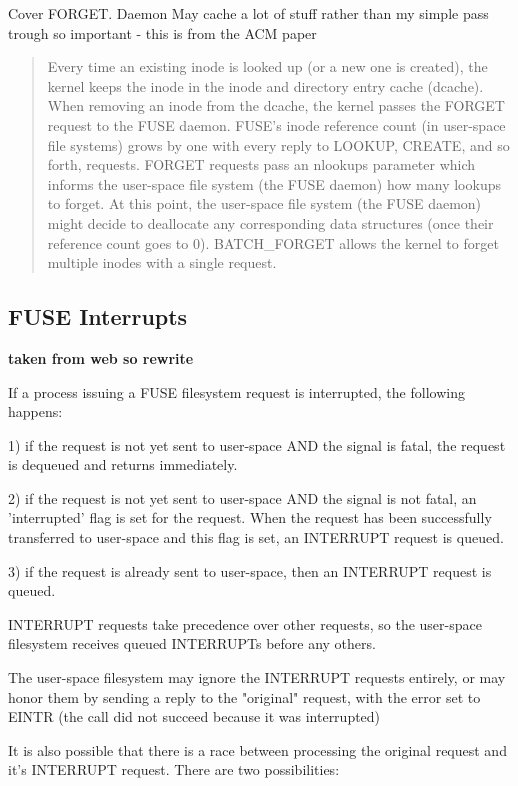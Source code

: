 Cover FORGET. Daemon May cache a lot of stuff rather than my simple pass trough so important - this is from the ACM paper

\begin{quote}
Every time an existing inode is looked up (or a new one is created), the kernel keeps the inode in the inode and directory entry cache (dcache). When removing an inode from the dcache, the kernel passes the FORGET request to the FUSE daemon. FUSE's inode reference count (in user-space file systems) grows by one with every reply to LOOKUP, CREATE, and so forth, requests. FORGET requests pass an nlookups parameter which informs the user-space file system (the FUSE daemon) how many lookups to forget. At this point, the user-space file system (the FUSE daemon) might decide to deallocate any corresponding data structures (once their reference count goes to 0). BATCH\_FORGET allows the kernel to forget multiple inodes with a single request.
\end{quote}


\subsection{FUSE Interrupts}

\textbf{taken from web so rewrite}

If a process issuing a FUSE filesystem request is interrupted, the following happens:

1) if the request is not yet sent to user-space AND the signal is fatal, the request is dequeued and returns immediately.

2) if the request is not yet sent to user-space AND the signal is not fatal, an 'interrupted' flag is set for the request.  When the request has been successfully transferred to user-space and this flag is set, an INTERRUPT request is queued.

3) if the request is already sent to user-space, then an INTERRUPT request is queued.

INTERRUPT requests take precedence over other requests, so the user-space filesystem receives queued INTERRUPTs before any others.

The user-space filesystem may ignore the INTERRUPT requests entirely, or may honor them by sending a reply to the "original" request, with the error set to EINTR (the call did not succeed because it was interrupted)

It is also possible that there is a race between processing the original request and it's INTERRUPT request.  There are two possibilities:


